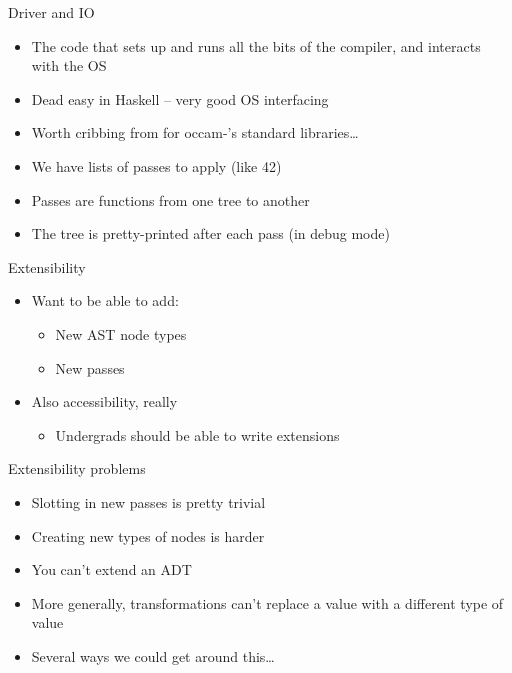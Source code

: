 \documentclass[adam,pdf,slideColor]{prosper}
\def\occampi{{occam-\Pisymbol{psy}{112}}\xspace}
\begin{document}
\begin{slide}{Driver and IO}
\begin{itemize}
\item The code that sets up and runs all the bits of the compiler, and
  interacts with the OS
\item Dead easy in Haskell -- very good OS interfacing
\item Worth cribbing from for \occampi's standard libraries\ldots
\item We have lists of passes to apply (like 42)
\item Passes are functions from one tree to another
\item The tree is pretty-printed after each pass (in debug mode)
\end{itemize}
\end{slide}

\begin{slide}{Extensibility}
\begin{itemize}
\item Want to be able to add:
\begin{itemize}
\item New AST node types
\item New passes
\end{itemize}
\item Also accessibility, really
\begin{itemize}
\item Undergrads should be able to write extensions
\end{itemize}
\end{itemize}
\end{slide}

\begin{slide}{Extensibility problems}
\begin{itemize}
\item Slotting in new passes is pretty trivial
\item Creating new types of nodes is harder
\item You can't extend an ADT
\item More generally, transformations can't replace a value with a
  different type of value
\item Several ways we could get around this\ldots
\end{itemize}
\end{slide}
\end{document}
